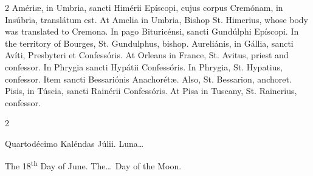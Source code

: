 \begin{paracol}{2}
\switchcolumn*
{}
Amériæ, in Umbria, 
 sancti Himérii Epíscopi, cujus corpus Cremónam, in Insúbria, translátum est.
\switchcolumn
{}
At Amelia in Umbria, Bishop St. 
 Himerius, whose body was translated to Cremona.
\switchcolumn*
{}
In pago Bituricénsi, 
 sancti Gundúlphi Epíscopi.
\switchcolumn
{}
In the territory of Bourges, St. 
 Gundulphus, bishop.
\switchcolumn*
{}
Aureliánis, in Gállia, 
 sancti Avíti, Presbyteri et Confessóris.
\switchcolumn
{}
At Orleans in France, St. Avitus, 
 priest and confessor.
\switchcolumn*
{}
In Phrygia sancti 
 Hypátii Confessóris.
\switchcolumn
{}
In Phrygia, St. Hypatius, confessor.
\switchcolumn*
{}
Item sancti Bessariónis 
 Anachorétæ.
\switchcolumn
{}
Also, St. Bessarion, anchoret.
\switchcolumn*
{}
Pisis, in Túscia, 
 sancti Rainérii Confessóris.
\switchcolumn
{}
At Pisa in Tuscany, St. Rainerius, 
 confessor.
\switchcolumn*
{}
\end{paracol}


\begin{paracol}{2}
\begin{center}{\color{gregoriocolor} Quartodécimo Kaléndas Júlii. 
 Luna\dots\ }\end{center}
\switchcolumn
{}
\begin{center}{\color{gregoriocolor} The 18\textsuperscript{th} Day of 
 June. The\dots\ Day of the Moon.}\end{center}
\end{paracol}

